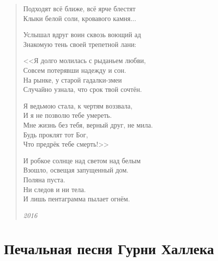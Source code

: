 \documentclass[a4paper,12pt,fleqn]{book}\usepackage{polyglossia}\setdefaultlanguage[babelshorthands=true]{russian}\setotherlanguage{english}\defaultfontfeatures{Ligatures=TeX,Mapping=tex-text}\usepackage{xcolor}\newcommand{\ml}[3]{#2}
\begin{document}
\begin{verse}
Подходят всё ближе, всё ярче блестят\\
Клыки белой соли, кровавого камня...

Услышал вдруг воин сквозь воющий ад\\
Знакомую тень своей трепетной лани:

<<Я долго молилась с рыданьем любви,\\
Совсем потерявши надежду и сон.\\
На рынке, у старой гадалки-змеи\\
Случайно узнала, что срок твой сочтён.

Я ведьмою стала, к чертям воззвала,\\
И я не позволю тебе умереть.\\
Мне жизнь без тебя, верный друг, не мила.\\
Будь проклят тот Бог,\\
Что предрёк тебе смерть!>>

И робкое солнце над светом над белым\\
Взошло, освещая запущенный дом.\\
Поляна пуста.\\
Ни следов и ни тела.\\
И лишь пентаграмма пылает огнём.

\emph{2016}
\end{verse}
\newpage

\section{Печальная песня Гурни Халлека}
\end{document}
